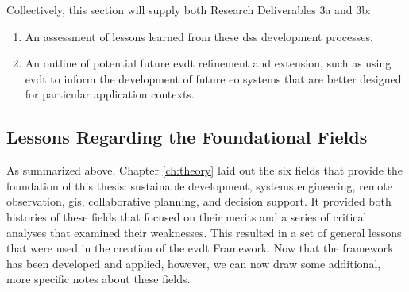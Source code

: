 Collectively, this section will supply both Research Deliverables 3a and 3b:

\begin{enumerate}[label=\emph{\alph*},itemsep=0pt,parsep=0pt]
	\item{An assessment of lessons learned from these \ac{dss} development processes.} 
	\item{An outline of potential future \ac{evdt} refinement and extension, such as using \ac{evdt} to inform the development of future \ac{eo} systems that are better designed for particular application contexts.} 
\end{enumerate}





\subsection{Lessons Regarding the Foundational Fields} \label{sec:lessons-foundational}

As summarized above, Chapter \ref{ch:theory} laid out the six fields that provide the foundation of this thesis: sustainable development, systems engineering, remote observation, \ac{gis}, collaborative planning, and decision support. It provided both histories of these fields that focused on their merits and a series of critical analyses that examined their weaknesses. This resulted in a set of general lessons that were used in the creation of the \ac{evdt} Framework. Now that the framework has been developed and applied, however, we can now draw some additional, more specific notes about these fields.   

